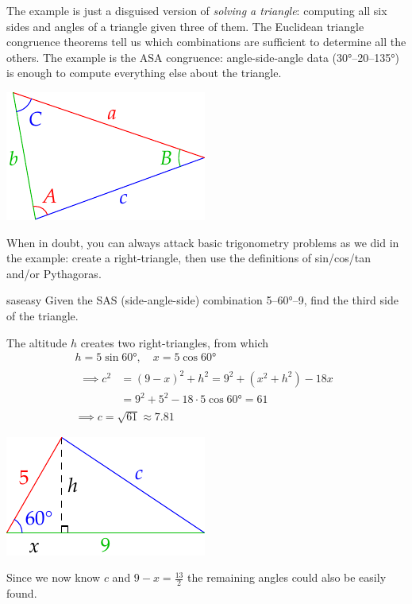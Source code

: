 \begin{minipage}[t]{0.7\textwidth}\vspace{-5pt}
	The example is just a disguised version of \emph{solving a triangle}: computing all six sides and angles of a triangle given three of them. The Euclidean triangle congruence theorems tell us which combinations are sufficient to determine all the others. The example is the ASA congruence: angle-side-angle data (\ang{30}--20--\ang{135}) is enough to compute everything else about the triangle.
\end{minipage}
\hfill
\begin{minipage}[t]{0.29\textwidth}\vspace{-10pt}
	\flushright\includegraphics{euler}
\end{minipage}\medbreak

When in doubt, you can always attack basic trigonometry problems as we did in the example: create a right-triangle, then use the definitions of sin/cos/tan and/or Pythagoras.

\begin{example}{}{saseasy}
	Given the SAS (side-angle-side) combination 5--\ang{60}--9, find the third side of the triangle.\par
	\begin{minipage}[t]{0.7\textwidth}\vspace{-5pt}
		The altitude $h$ creates two right-triangles, from which
		\begin{gather*}
			h=5\sin\ang{60},\quad x=5\cos\ang{60}\\[5pt]
			\begin{aligned}
				\implies c^2&=(9-x)^2+h^2=9^2+(x^2+h^2)-18x\\
				&=9^2+5^2-18\cdot 5\cos\ang{60}=61
			\end{aligned}\\
			\implies c=\sqrt{61} \approx 7.81
		\end{gather*}
	\end{minipage}
	\hfill
	\begin{minipage}[t]{0.29\textwidth}\vspace{0pt}
		\flushright\includegraphics{exsas2}
	\end{minipage}\medbreak
	Since we now know $c$ and $9-x=\frac{13}2$ the remaining angles could also be easily found.
\end{example}
\goodbreak


